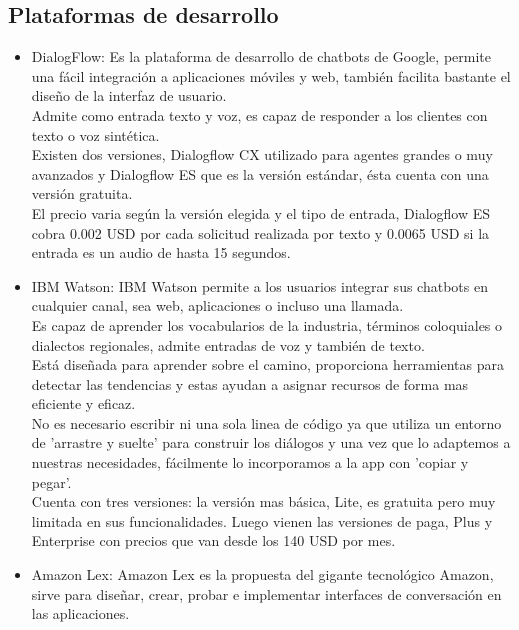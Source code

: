 \subsection{Plataformas de desarrollo}
\begin{itemize}
	\item DialogFlow:
	      Es la plataforma de desarrollo de chatbots de Google, permite una fácil integración a
	      aplicaciones móviles y web, también facilita bastante el diseño de la interfaz de usuario.\\
	      Admite como entrada texto y voz, es capaz de responder a los clientes con texto o voz
	      sintética.\\
	      Existen dos versiones, Dialogflow CX utilizado para agentes grandes o muy avanzados y
	      Dialogflow ES que es la versión estándar, ésta cuenta con una versión gratuita.\\
	      El precio varia según la versión elegida y el tipo de entrada, Dialogflow ES cobra 0.002
	      USD por cada solicitud realizada por texto y 0.0065 USD si la entrada es un audio de hasta 15
	      segundos.\cite{Dialogflow}
	\item IBM Watson:
	      IBM Watson  permite a los usuarios integrar sus chatbots en cualquier canal, sea web,
	      aplicaciones o incluso una llamada.\\
	      Es capaz de aprender los vocabularios de la industria,	términos coloquiales o dialectos
	      regionales, admite entradas de voz y también de texto. \\
	      Está diseñada para aprender sobre el camino, proporciona herramientas para detectar las
	      tendencias y estas ayudan a asignar recursos de forma mas eficiente y eficaz.\\
	      No es necesario escribir ni una sola linea de código ya que utiliza un entorno de 'arrastre
	      y suelte' para construir los diálogos y una vez que lo adaptemos a nuestras necesidades, fácilmente
	      lo incorporamos a la app con 'copiar y pegar'.\cite{IBMCloud2020}\\
	      Cuenta con tres versiones: la versión mas básica, Lite, es gratuita pero muy limitada en
	      sus funcionalidades.
	      Luego vienen las versiones de paga, Plus y Enterprise con precios que van desde los 140 USD
	      por mes.\cite{IBM_Price}
	\item Amazon Lex:
	      Amazon Lex es la propuesta del gigante tecnológico Amazon, sirve para diseñar, crear,
	      probar e implementar interfaces de conversación en las aplicaciones.\\

\end{itemize}
